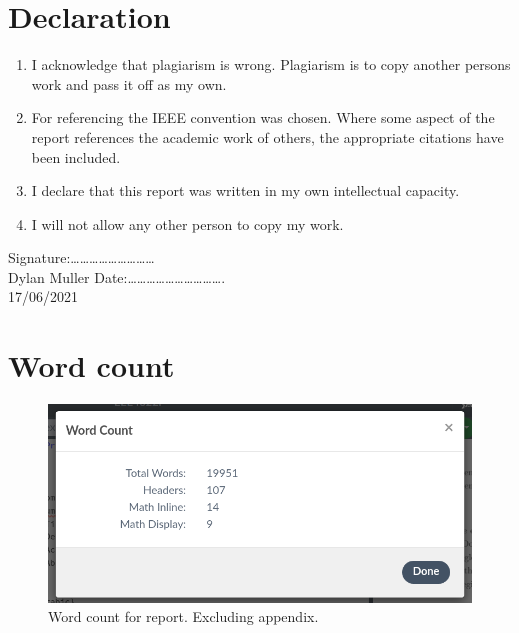 \section{Declaration}

\begin{enumerate}
\item I acknowledge that plagiarism is wrong. Plagiarism is to copy another persons work and pass it off as my own.
\item For referencing the IEEE convention was chosen. Where some aspect of the report references the academic work of others, the appropriate citations have been included.
\item I declare that this report was written in my own intellectual capacity.
\item I will not allow any other person to copy my work.
\end{enumerate}
\vskip 10mm
Signature:\ldots\ldots\ldots\ldots\ldots\ldots\ldots\ldots\ldots 
\\Dylan Muller
\vskip10mm
Date:\ldots\ldots\ldots\ldots\ldots\ldots\ldots\ldots\ldots\ldots .
\\17/06/2021

\section{Word count}
\begin{figure}[H]
\centering
\includegraphics[width=0.8\columnwidth]{Figures/Fig_87.png}
\caption{Word count for report. Excluding appendix.}
\label{fig:gantt}
\end{figure}